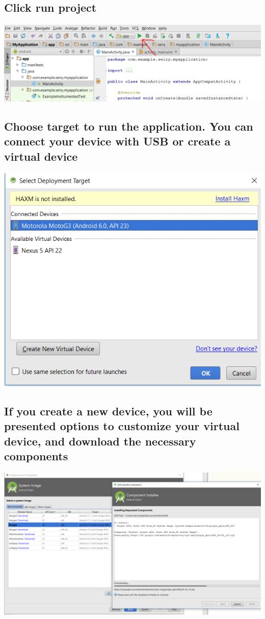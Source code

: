 \documentclass{article}
\begin{document}
\subsection{Click run project}

\includegraphics[width=\textwidth]{lab1-5}

\subsection{Choose target to run the application. You can connect your device with USB or create a virtual device}

\includegraphics[width=\textwidth]{lab1-7}

\subsection{If you create a new device, you will be presented options to customize your virtual device, and download the necessary components}

\includegraphics[width=\textwidth]{lab1-6}
\end{document}

